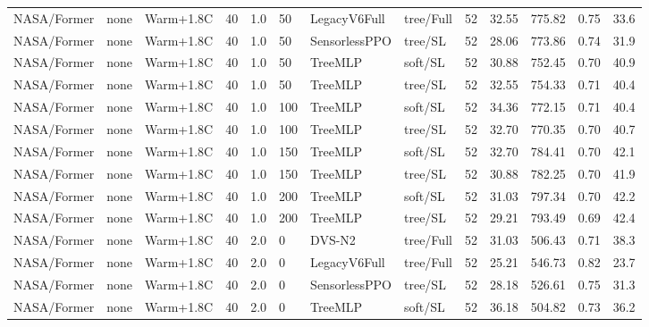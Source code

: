 \documentclass[10pt,a4paper]{article}
\begin{document}
\begin{landscape}
\begin{longtable}{llllllllrrrrr}
NASA/Former & none & Warm+1.8C & 40 & 1.0 & 50 & LegacyV6Full & tree/Full & 52 & 32.55 & 775.82 & 0.75 & 33.6 \\

NASA/Former & none & Warm+1.8C & 40 & 1.0 & 50 & SensorlessPPO & tree/SL & 52 & 28.06 & 773.86 & 0.74 & 31.9 \\

NASA/Former & none & Warm+1.8C & 40 & 1.0 & 50 & TreeMLP & soft/SL & 52 & 30.88 & 752.45 & 0.70 & 40.9 \\

NASA/Former & none & Warm+1.8C & 40 & 1.0 & 50 & TreeMLP & tree/SL & 52 & 32.55 & 754.33 & 0.71 & 40.4 \\

NASA/Former & none & Warm+1.8C & 40 & 1.0 & 100 & TreeMLP & soft/SL & 52 & 34.36 & 772.15 & 0.71 & 40.4 \\

NASA/Former & none & Warm+1.8C & 40 & 1.0 & 100 & TreeMLP & tree/SL & 52 & 32.70 & 770.35 & 0.70 & 40.7 \\

NASA/Former & none & Warm+1.8C & 40 & 1.0 & 150 & TreeMLP & soft/SL & 52 & 32.70 & 784.41 & 0.70 & 42.1 \\

NASA/Former & none & Warm+1.8C & 40 & 1.0 & 150 & TreeMLP & tree/SL & 52 & 30.88 & 782.25 & 0.70 & 41.9 \\

NASA/Former & none & Warm+1.8C & 40 & 1.0 & 200 & TreeMLP & soft/SL & 52 & 31.03 & 797.34 & 0.70 & 42.2 \\

NASA/Former & none & Warm+1.8C & 40 & 1.0 & 200 & TreeMLP & tree/SL & 52 & 29.21 & 793.49 & 0.69 & 42.4 \\

NASA/Former & none & Warm+1.8C & 40 & 2.0 & 0 & DVS-N2 & tree/Full & 52 & 31.03 & 506.43 & 0.71 & 38.3 \\

NASA/Former & none & Warm+1.8C & 40 & 2.0 & 0 & LegacyV6Full & tree/Full & 52 & 25.21 & 546.73 & 0.82 & 23.7 \\

NASA/Former & none & Warm+1.8C & 40 & 2.0 & 0 & SensorlessPPO & tree/SL & 52 & 28.18 & 526.61 & 0.75 & 31.3 \\

NASA/Former & none & Warm+1.8C & 40 & 2.0 & 0 & TreeMLP & soft/SL & 52 & 36.18 & 504.82 & 0.73 & 36.2 \\


\end{longtable}
\end{landscape}
\end{document}

